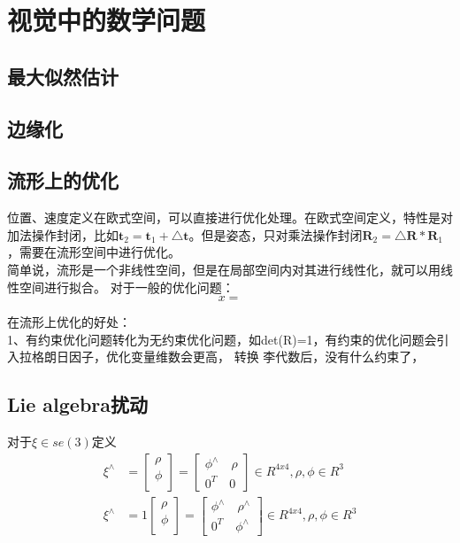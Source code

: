 \chapter{视觉中的数学问题}

\section{最大似然估计}

\section{边缘化}	


\section{流形上的优化}
位置、速度定义在欧式空间，可以直接进行优化处理。在欧式空间定义，特性是对加法操作封闭，比如$\textbf{t}_2=\textbf{t}_1+\bigtriangleup \textbf{t}$。但是姿态，只对乘法操作封闭$\textbf{R}_2=\bigtriangleup \textbf{R}*\textbf{R}_1$，需要在流形空间中进行优化。\\
简单说，流形是一个非线性空间，但是在局部空间内对其进行线性化，就可以用线性空间进行拟合。
\indent 对于一般的优化问题：
\begin{equation}
x=
\end{equation}


在流形上优化的好处：\\
1、有约束优化问题转化为无约束优化问题，如det(R)=1，有约束的优化问题会引入拉格朗日因子，优化变量维数会更高， 转换 李代数后，没有什么约束了，


\section{Lie algebra扰动}

对于$\xi\in se(3)$定义\\
\begin{align}
	\xi^\wedge &=
	\left[ \begin{array}{c}   %
	\rho \\  %
	\phi \\  %
	\end{array}	\right] = 
	\left[ \begin{array}{cc}
	   \phi^\wedge \quad  \rho \\
	    0^T        \quad  0
	\end{array} \right] \in R^{4x4},\rho,\phi\in R^3 \\	
	\xi^\wedge &=1
	\left[ \begin{array}{c}   %
      	\rho \\  %
    	\phi \\  %
	\end{array}	\right] = 
	\left[ \begin{array}{cc}
    	\phi^\wedge \quad  \rho^\wedge \\
    	0^T         \quad  \phi^\wedge
	\end{array} \right] \in R^{4x4},\rho,\phi\in R^3
\end{align}


